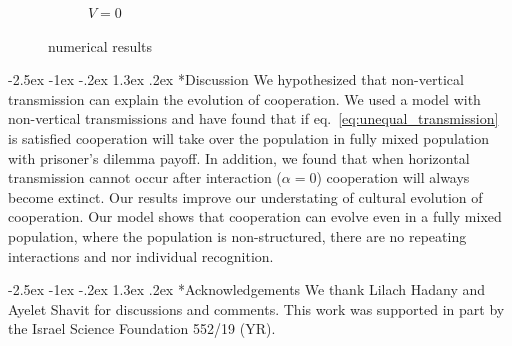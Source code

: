 \documentclass[12pt]{extarticle}
\makeatletter
\renewcommand\section{\@startsection {section}{1}{\z@}%
     {-2.5ex \@plus -1ex \@minus -.2ex}%
     {1.3ex \@plus.2ex}%
    {\Large\bfseries}}
\makeatother
\begin{document}
\begin{figure}[H]
\begin{subfigure}{8cm}
    \caption{$V=0$}
    \label{fig:results_c}
  \end{subfigure}
  \label{fig:results}
  \caption{numerical results}
\end{figure}

\section*{Discussion}
We hypothesized that non-vertical transmission can explain the evolution of cooperation. We used a model with non-vertical transmissions and have found that if eq.~\ref{eq:unequal_transmission} is satisfied cooperation will take over the population in fully mixed population with prisoner's dilemma payoff. In addition, we found that when horizontal transmission cannot occur after interaction ($\alpha = 0$) cooperation will always become extinct. 
Our results improve our understating of cultural evolution of cooperation. Our model shows that cooperation can evolve even in a fully mixed population, where the population is non-structured, there are no repeating interactions and nor individual recognition.

{\small
\section*{Acknowledgements}
We thank Lilach Hadany and Ayelet Shavit for discussions and comments.
This work was supported in part by
the Israel Science Foundation 552/19 (YR).
}




\newpage
\end{document}
